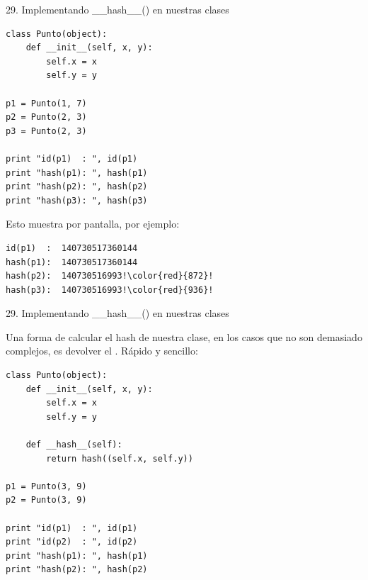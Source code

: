 \documentclass[14pt]{beamer}
\begin{document}
\begin{frame}[fragile]
  {29. \normalsize Implementando \_\_hash\_\_() en nuestras clases}
  \tiny
  \begin{exampleblock}{}
    \begin{lstlisting}
class Punto(object):
    def __init__(self, x, y):
        self.x = x
        self.y = y

p1 = Punto(1, 7)
p2 = Punto(2, 3)
p3 = Punto(2, 3)

print "id(p1)  : ", id(p1)
print "hash(p1): ", hash(p1)
print "hash(p2): ", hash(p2)
print "hash(p3): ", hash(p3)
    \end{lstlisting}
  \end{exampleblock}

  \begin{exampleblock}
    {\scriptsize
      Esto muestra por pantalla, por ejemplo:}
    \begin{lstlisting}[escapechar=!]
id(p1)  :  140730517360144
hash(p1):  140730517360144
hash(p2):  140730516993!\color{red}{872}!
hash(p3):  140730516993!\color{red}{936}!
    \end{lstlisting}
  \end{exampleblock}
\end{frame}

\begin{frame}[fragile]
  {29. \normalsize Implementando \_\_hash\_\_() en nuestras clases}
  \footnotesize
  \begin{block}{}
    \centering
    Una forma de calcular el hash de nuestra clase, en los casos que
    no son demasiado complejos, es devolver el . Rápido y
    sencillo:
  \end{block}

  \scriptsize
  \begin{exampleblock} {}
    \begin{lstlisting}
class Punto(object):
    def __init__(self, x, y):
        self.x = x
        self.y = y

    def __hash__(self):
        return hash((self.x, self.y))

p1 = Punto(3, 9)
p2 = Punto(3, 9)

print "id(p1)  : ", id(p1)
print "id(p2)  : ", id(p2)
print "hash(p1): ", hash(p1)
print "hash(p2): ", hash(p2)
    \end{lstlisting}
  \end{exampleblock}
\end{frame}
\end{document}
